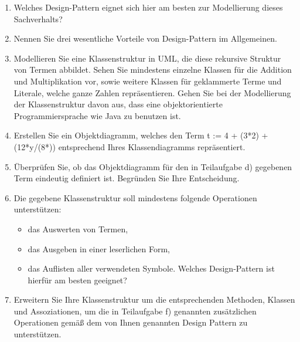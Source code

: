 \documentclass{lehramt-informatik-aufgabe}
\begin{document}
\begin{enumerate}


\item Welches Design-Pattern eignet sich hier am besten zur Modellierung
dieses Sachverhalts?

\item Nennen Sie drei wesentliche Vorteile von Design-Pattern im
Allgemeinen.


\item Modellieren Sie eine Klassenstruktur in UML, die diese rekursive
Struktur von Termen abbildet. Sehen Sie mindestens einzelne Klassen
für die Addition und Multiplikation vor, sowie weitere Klassen für
geklammerte Terme und Literale, welche ganze Zahlen repräsentieren.
Gehen Sie bei der Modellierung der Klassenstruktur davon aus, dass eine
objektorientierte Programmiersprache wie Java zu benutzen ist.


\item Erstellen Sie ein Objektdiagramm, welches den Term t := 4 + (3*2)
+ (12*y/(8*)) entsprechend Ihres Klassendiagramms repräsentiert.


\item Überprüfen Sie, ob das Objektdiagramm für den in Teilaufgabe d)
gegebenen Term eindeutig definiert ist. Begründen Sie Ihre Entscheidung.


\item Die gegebene Klassenstruktur soll mindestens folgende Operationen
unterstützen:

\begin{itemize}
\item das Auswerten von Termen,
\item das Ausgeben in einer leserlichen Form,
\item das Auflisten aller verwendeten Symbole.
Welches Design-Pattern ist hierfür am besten geeignet?

\end{itemize}

\item Erweitern Sie Ihre Klassenstruktur um die entsprechenden Methoden,
Klassen und Assoziationen, um die in Teilaufgabe f) genannten
zusätzlichen Operationen gemäß dem von Ihnen genannten Design Pattern zu
unterstützen.

\end{enumerate}
\end{document}
